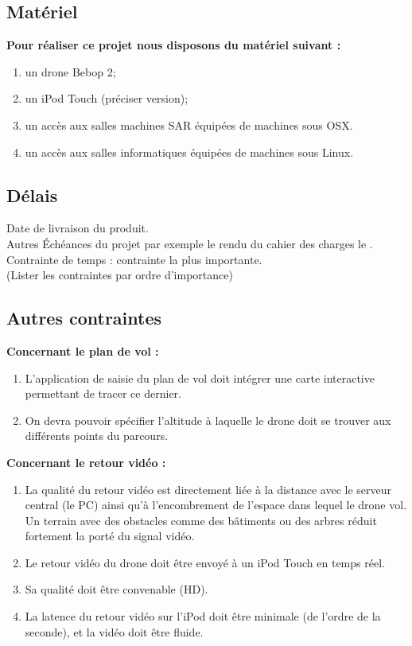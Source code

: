 \documentclass{article}
\begin{document}
	\subsection{Matériel}
		\begin{flushleft}
	        \textbf{Pour réaliser ce projet nous disposons du matériel suivant :}
	    \end{flushleft}
		\begin{enumerate}
        \item un drone Bebop 2;
        \item un iPod Touch (préciser version);
        \item un accès aux salles machines SAR équipées de machines sous OSX.
        \item un accès aux salles informatiques équipées de machines sous Linux.
        \end{enumerate}
	\subsection{Délais}
		Date de livraison du produit.\\
		Autres Échéances du projet par exemple le rendu du cahier des charges le .
		Contrainte de temps : contrainte la plus importante.\\
		(Lister les contraintes par ordre d'importance)
	\subsection{Autres contraintes}
	    \begin{flushleft}
	        \textbf{Concernant le plan de vol :} 
	    \end{flushleft}
	    \begin{enumerate}
            \item  L'application de saisie du plan de vol doit intégrer une carte interactive permettant de tracer ce dernier.
    		 \item On devra pouvoir spécifier l'altitude à laquelle le drone doit se trouver aux différents points du parcours.
		 \end{enumerate}
		
	    \begin{flushleft}
	        \textbf{Concernant le retour vidéo :}
	    \end{flushleft}
	     \begin{enumerate}
	     \item La qualité du retour vidéo est directement liée à la distance avec le serveur central (le PC) ainsi qu'à l'encombrement de l'espace dans lequel le drone vol. Un terrain avec des obstacles comme des bâtiments ou des arbres réduit fortement la porté du signal vidéo.
	     \item Le retour vidéo du drone doit être envoyé à un iPod Touch en temps réel.
	     \item Sa qualité doit être convenable (HD).
		 \item La latence du retour vidéo sur l'iPod doit être minimale (de l'ordre de la seconde), et la vidéo doit être fluide.
		 \end{enumerate}
		 
\end{document}

